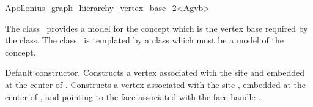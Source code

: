 
\begin{ccRefClass}{Apollonius_graph_hierarchy_vertex_base_2<Agvb>}


\ccDefinition

The class \ccRefName\ provides a model for the
 concept which is the vertex
base required by the 
class. The class \ccRefName\ is templated by a class  which
must be a model of the  concept.


\ccInheritsFrom
{}

\ccIsModel
{}

\ccCreation
{}  %

{Default constructor.}
\ccGlue
{}
{Constructs a vertex associated with the site  and
embedded at the center of .}
\ccGlue
{}
	      {Constructs a vertex associated with
		the site , embedded at the center of ,
		and pointing to the face associated with the face
		handle .}



\ccSeeAlso
{}\\
\\
\\

\end{ccRefClass}


